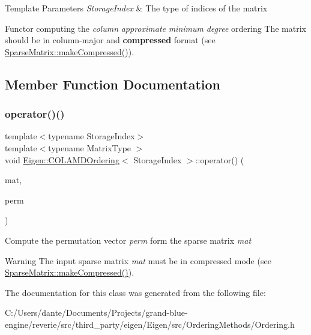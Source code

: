 \begin{DoxyTemplParams}{Template Parameters}
{\em Storage\+Index} & The type of indices of the matrix\\
\hline
\end{DoxyTemplParams}
Functor computing the {\itshape column} {\itshape approximate} {\itshape minimum} {\itshape degree} ordering The matrix should be in column-\/major and {\bfseries{compressed}} format (see \mbox{\hyperlink{class_eigen_1_1_sparse_matrix_a5ff54ffc10296f9466dc81fa888733fd}{Sparse\+Matrix\+::make\+Compressed()}}). 

\subsection{Member Function Documentation}
\mbox{\label{class_eigen_1_1_c_o_l_a_m_d_ordering_a708cb20191dcd79856d922f262405946}} 
\subsubsection{\texorpdfstring{operator()()}{operator()()}}
{\footnotesize\ttfamily template$<$typename Storage\+Index$>$ \\
template$<$typename Matrix\+Type $>$ \\
void \mbox{\hyperlink{class_eigen_1_1_c_o_l_a_m_d_ordering}{Eigen\+::\+C\+O\+L\+A\+M\+D\+Ordering}}$<$ Storage\+Index $>$\+::operator() (\begin{DoxyParamCaption}\item[{const Matrix\+Type \&}]{mat,  }\item[{\mbox{\hyperlink{class_eigen_1_1_permutation_matrix}{Permutation\+Type}} \&}]{perm }\end{DoxyParamCaption})\hspace{0.3cm}{\ttfamily [inline]}}

Compute the permutation vector {\itshape perm} form the sparse matrix {\itshape mat} \begin{DoxyWarning}{Warning}
The input sparse matrix {\itshape mat} must be in compressed mode (see \mbox{\hyperlink{class_eigen_1_1_sparse_matrix_a5ff54ffc10296f9466dc81fa888733fd}{Sparse\+Matrix\+::make\+Compressed()}}). 
\end{DoxyWarning}


The documentation for this class was generated from the following file\+:\begin{DoxyCompactItemize}
\item 
C\+:/\+Users/dante/\+Documents/\+Projects/grand-\/blue-\/engine/reverie/src/third\+\_\+party/eigen/\+Eigen/src/\+Ordering\+Methods/Ordering.\+h\end{DoxyCompactItemize}
